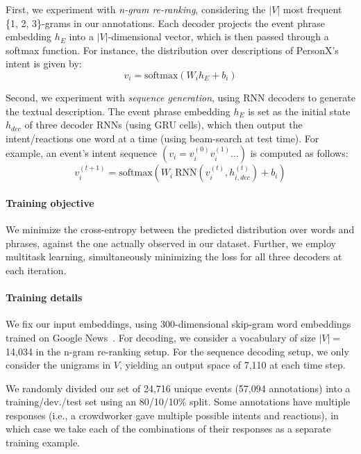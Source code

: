 \documentclass[11pt,a4paper]{article}
\begin{document}
First, we experiment with \textit{n-gram re-ranking}, considering the $|V|$ most frequent \{1, 2, 3\}-grams in our annotations.
Each decoder projects the event phrase embedding $h_E$ into a $|V|$-dimensional vector, which is then passed through a softmax function. For instance, the distribution over descriptions of PersonX's intent is given by:
\[v_i = \textrm{softmax}(W_i h_E +b_i) \] 



\noindent Second, we experiment with \textit{sequence generation}, using RNN decoders to generate the textual description.
The event phrase embedding $h_E$ is set as the initial state $h_{dec}$ of three decoder RNNs (using GRU cells), which then output the intent/reactions one word at a time (using beam-search at test time).
For example, an event's intent sequence $(v_i = v_i^{(0)}v_i^{(1)}\ldots)$ is computed as follows: 
\[v_i^{(t+1)} = \textrm{softmax}(W_i~\textrm{RNN}(v_i^{(t)}, h_{i,dec}^{(t)}) + b_i) \]


\paragraph{Training objective}
We minimize the cross-entropy between the predicted distribution over words and phrases, against the one actually observed in our dataset. 
Further, we employ multitask learning, simultaneously minimizing the loss for all three decoders at each iteration.

\paragraph{Training details}
We fix our input embeddings, using 300-dimensional skip-gram 
word embeddings trained on Google News~\cite{Mikolov2013EfficientEO}. 
For decoding, we consider a vocabulary of size $|V|=$ 14,034 in the n-gram re-ranking setup.
For the sequence decoding setup, we only consider the unigrams in $V$, yielding an output space of 7,110 at each time step.




We randomly divided our set of 24,716 unique events (57,094 annotations) into a training/dev./test set using an 80/10/10\% split.  Some annotations have multiple responses (i.e., a crowdworker gave multiple possible intents and reactions), in which case we take each of the combinations of their responses as a separate training example. 
\end{document}
